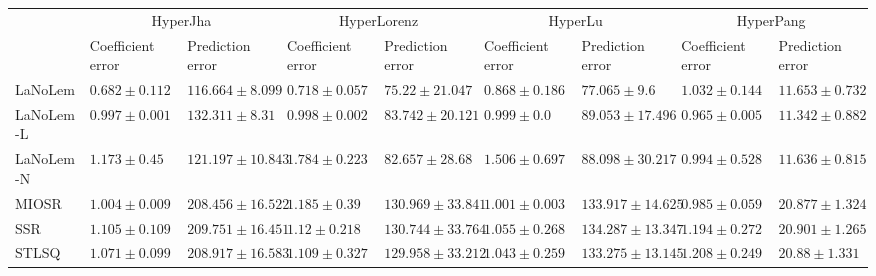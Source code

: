\begin{table*}
{\begin{tabular}{lllllllll}
 & \multicolumn{2}{c}{HyperJha} & \multicolumn{2}{c}{HyperLorenz} & \multicolumn{2}{c}{HyperLu} & \multicolumn{2}{c}{HyperPang} \\
 & Coefficient error & Prediction error & Coefficient error & Prediction error & Coefficient error & Prediction error & Coefficient error & Prediction error \\
\midrule
LaNoLem & $\mathbf{0.682}\pm 0.112$ & $\mathbf{116.664}\pm 8.099$ & $\mathbf{0.718}\pm 0.057$ & $\mathbf{75.22}\pm 21.047$ & $\mathbf{0.868}\pm 0.186$ & $\mathbf{77.065}\pm 9.6$ & $1.032\pm 0.144$ & $11.653\pm 0.732$ \\
LaNoLem-L & $0.997\pm 0.001$ & $132.311\pm 8.31$ & $0.998\pm 0.002$ & $83.742\pm 20.121$ & $0.999\pm 0.0$ & $89.053\pm 17.496$ & $\mathbf{0.965}\pm 0.005$ & $\mathbf{11.342}\pm 0.882$ \\
LaNoLem-N & $1.173\pm 0.45$ & $121.197\pm 10.843$ & $1.784\pm 0.223$ & $82.657\pm 28.68$ & $1.506\pm 0.697$ & $88.098\pm 30.217$ & $0.994\pm 0.528$ & $11.636\pm 0.815$ \\
MIOSR & $1.004\pm 0.009$ & $208.456\pm 16.522$ & $1.185\pm 0.39$ & $130.969\pm 33.841$ & $1.001\pm 0.003$ & $133.917\pm 14.625$ & $0.985\pm 0.059$ & $20.877\pm 1.324$ \\
SSR & $1.105\pm 0.109$ & $209.751\pm 16.451$ & $1.12\pm 0.218$ & $130.744\pm 33.764$ & $1.055\pm 0.268$ & $134.287\pm 13.347$ & $1.194\pm 0.272$ & $20.901\pm 1.265$ \\
STLSQ & $1.071\pm 0.099$ & $208.917\pm 16.583$ & $1.109\pm 0.327$ & $129.958\pm 33.212$ & $1.043\pm 0.259$ & $133.275\pm 13.145$ & $1.208\pm 0.249$ & $20.88\pm 1.331$ \\

\midrule


\end{tabular}}
\end{table*}
